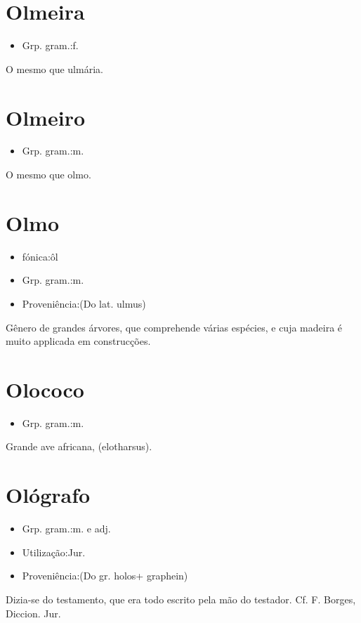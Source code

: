 \section{Olmeira}
\begin{itemize}
\item {Grp. gram.:f.}
\end{itemize}
O mesmo que \textunderscore ulmária\textunderscore .
\section{Olmeiro}
\begin{itemize}
\item {Grp. gram.:m.}
\end{itemize}
O mesmo que \textunderscore olmo\textunderscore .
\section{Olmo}
\begin{itemize}
\item {fónica:ôl}
\end{itemize}
\begin{itemize}
\item {Grp. gram.:m.}
\end{itemize}
\begin{itemize}
\item {Proveniência:(Do lat. \textunderscore ulmus\textunderscore )}
\end{itemize}
Gênero de grandes árvores, que comprehende várias espécies, e cuja madeira é muito applicada em construcções.
\section{Olococo}
\begin{itemize}
\item {Grp. gram.:m.}
\end{itemize}
Grande ave africana, (\textunderscore elotharsus\textunderscore ).
\section{Ológrafo}
\begin{itemize}
\item {Grp. gram.:m.  e  adj.}
\end{itemize}
\begin{itemize}
\item {Utilização:Jur.}
\end{itemize}
\begin{itemize}
\item {Proveniência:(Do gr. \textunderscore holos\textunderscore  + \textunderscore graphein\textunderscore )}
\end{itemize}
Dizia-se do testamento, que era todo escrito pela mão do testador. Cf. F. Borges, \textunderscore Diccion. Jur.\textunderscore 
